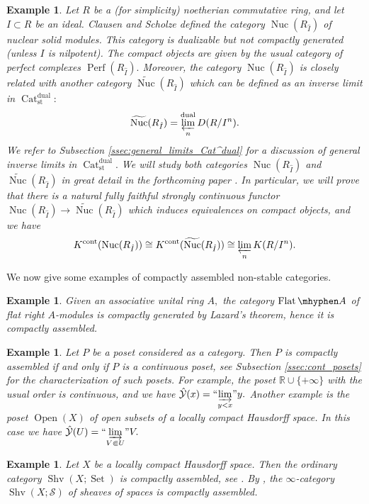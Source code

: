 \documentclass[11pt,leqno]{amsart}
\newtheorem{example}[theo]{Example}
\numberwithin{equation}{section}
\def\R{\mathbb{R}}
\def\wt{\widetilde}
\newcommand{\hy}{\mhyphen}
\newcommand{\indlim}[1][]{\mathop{\varinjlim}\limits_{#1}}
\newcommand{\inddlim}[1][]{{``{\indlim[#1]}"}}
\newcommand{\prolim}[1][]{\mathop{\varprojlim}\limits_{#1}}
\newcommand{\Nuc}{\operatorname{Nuc}}
\newcommand{\Flat}{\operatorname{Flat}}
\newcommand{\Cat}{\operatorname{Cat}}
\newcommand{\cont}{\operatorname{cont}}
\newcommand{\st}{\operatorname{st}}
\newcommand{\dual}{\operatorname{dual}}
\newcommand{\cY}{{\mathcal Y}}
\newcommand{\cS}{{\mathcal S}}
\newcommand{\Perf}{\operatorname{Perf}}
\newcommand{\Sh}{\operatorname{Shv}}
\newcommand{\Set}{\operatorname{Set}}
\newcommand{\Open}{\operatorname{Open}}
\begin{document}
\begin{example}\label{ex:nuc} Let $R$ be a (for simplicity) noetherian commutative ring, and let $I\subset R$ be an ideal. Clausen and Scholze \cite{CS} defined the category $\Nuc(R_{\hat{I}})$ of nuclear solid modules. This category is dualizable but not compactly generated (unless $I$ is nilpotent). The compact objects are given by the usual category of perfect complexes $\Perf(R_{\hat{I}}).$ Moreover, the category $\Nuc(R_{\hat{I}})$ is closely related with another category $\wt{\Nuc}(R_{\hat{I}})$ which can be defined as an inverse limit in $\Cat_{\st}^{\dual}:$
$$\wt{\Nuc}(R_{\hat{I}})=\prolim[n]^{\dual}D(R/I^n).$$
We refer to Subsection \ref{ssec:general_limits_Cat^dual} for a discussion of general inverse limits in $\Cat_{\st}^{\dual}.$ We will study both categories $\Nuc(R_{\hat{I}})$ and $\wt{\Nuc}(R_{\hat{I}})$ in great detail in the forthcoming paper \cite{E1}. In particular, we will prove that there is a natural fully faithful strongly continuous functor $\Nuc(R_{\hat{I}})\to \wt{\Nuc}(R_{\hat{I}})$ which induces equivalences on compact objects, and we have
$$K^{\cont}(\Nuc(R_{\hat{I}}))\cong K^{\cont}(\wt{\Nuc}(R_{\hat{I}}))\cong\prolim[n]K(R/I^n).$$\end{example}

We now give some examples of compactly assembled non-stable categories.

\begin{example}Given an associative unital ring $A,$ the category $\Flat\hy A$ of flat right $A$-modules is compactly generated by Lazard's theorem, hence it is compactly assembled.\end{example}

\begin{example}Let $P$ be a poset considered as a category. Then $P$ is compactly assembled if and only if $P$ is a continuous poset, see Subsection \ref{ssec:cont_posets} for the characterization of such posets. For example, the poset $\R\cup\{+\infty\}$ with the usual order is continuous, and we have $\hat{\cY}(x)=\inddlim[y<x]y.$ Another example is the poset $\Open(X)$ of open subsets of a locally compact Hausdorff space. In this case we have $\hat{\cY}(U)=\inddlim[V\Subset U]V.$\end{example}

\begin{example}Let $X$ be a locally compact Hausdorff space. Then the ordinary category $\Sh(X;\Set)$ is compactly assembled, see \cite{JJ}. By \cite{Lur18}, the $\infty$-category $\Sh(X;\cS)$ of sheaves of spaces is compactly assembled.\end{example}
\end{document}
